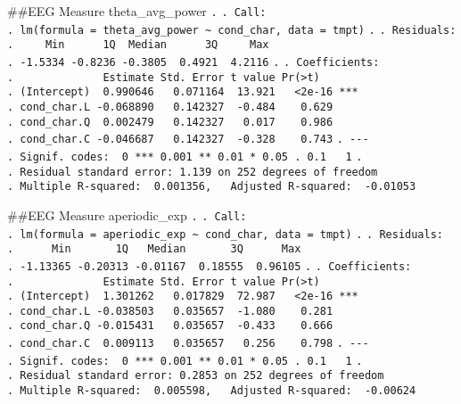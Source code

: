 \documentclass[
]{article}
\begin{document}
\#\#EEG Measure theta\_avg\_power \texttt{.} \texttt{.\ Call:}
\texttt{.\ lm(formula\ =\ theta\_avg\_power\ \textasciitilde{}\ cond\_char,\ data\ =\ tmpt)}
\texttt{.} \texttt{.\ Residuals:}
\texttt{.\ \ \ \ \ Min\ \ \ \ \ \ 1Q\ \ Median\ \ \ \ \ \ 3Q\ \ \ \ \ Max}
\texttt{.\ -1.5334\ -0.8236\ -0.3805\ \ 0.4921\ \ 4.2116} \texttt{.}
\texttt{.\ Coefficients:}
\texttt{.\ \ \ \ \ \ \ \ \ \ \ \ \ \ Estimate\ Std.\ Error\ t\ value\ Pr(\textgreater{}\textbar{}t\textbar{})}
\texttt{.\ (Intercept)\ \ 0.990646\ \ \ 0.071164\ \ 13.921\ \ \ \textless{}2e-16\ ***}
\texttt{.\ cond\_char.L\ -0.068890\ \ \ 0.142327\ \ -0.484\ \ \ \ 0.629}
\texttt{.\ cond\_char.Q\ \ 0.002479\ \ \ 0.142327\ \ \ 0.017\ \ \ \ 0.986}
\texttt{.\ cond\_char.C\ -0.046687\ \ \ 0.142327\ \ -0.328\ \ \ \ 0.743}
\texttt{.\ -\/-\/-}
\texttt{.\ Signif.\ codes:\ \ 0\ \textquotesingle{}***\textquotesingle{}\ 0.001\ \textquotesingle{}**\textquotesingle{}\ 0.01\ \textquotesingle{}*\textquotesingle{}\ 0.05\ \textquotesingle{}.\textquotesingle{}\ 0.1\ \textquotesingle{}\ \textquotesingle{}\ 1}
\texttt{.}
\texttt{.\ Residual\ standard\ error:\ 1.139\ on\ 252\ degrees\ of\ freedom}
\texttt{.\ Multiple\ R-squared:\ \ 0.001356,\ \ \ Adjusted\ R-squared:\ \ -0.01053}

\#\#EEG Measure aperiodic\_exp \texttt{.} \texttt{.\ Call:}
\texttt{.\ lm(formula\ =\ aperiodic\_exp\ \textasciitilde{}\ cond\_char,\ data\ =\ tmpt)}
\texttt{.} \texttt{.\ Residuals:}
\texttt{.\ \ \ \ \ \ Min\ \ \ \ \ \ \ 1Q\ \ \ Median\ \ \ \ \ \ \ 3Q\ \ \ \ \ \ Max}
\texttt{.\ -1.13365\ -0.20313\ -0.01167\ \ 0.18555\ \ 0.96105}
\texttt{.} \texttt{.\ Coefficients:}
\texttt{.\ \ \ \ \ \ \ \ \ \ \ \ \ \ Estimate\ Std.\ Error\ t\ value\ Pr(\textgreater{}\textbar{}t\textbar{})}
\texttt{.\ (Intercept)\ \ 1.301262\ \ \ 0.017829\ \ 72.987\ \ \ \textless{}2e-16\ ***}
\texttt{.\ cond\_char.L\ -0.038503\ \ \ 0.035657\ \ -1.080\ \ \ \ 0.281}
\texttt{.\ cond\_char.Q\ -0.015431\ \ \ 0.035657\ \ -0.433\ \ \ \ 0.666}
\texttt{.\ cond\_char.C\ \ 0.009113\ \ \ 0.035657\ \ \ 0.256\ \ \ \ 0.798}
\texttt{.\ -\/-\/-}
\texttt{.\ Signif.\ codes:\ \ 0\ \textquotesingle{}***\textquotesingle{}\ 0.001\ \textquotesingle{}**\textquotesingle{}\ 0.01\ \textquotesingle{}*\textquotesingle{}\ 0.05\ \textquotesingle{}.\textquotesingle{}\ 0.1\ \textquotesingle{}\ \textquotesingle{}\ 1}
\texttt{.}
\texttt{.\ Residual\ standard\ error:\ 0.2853\ on\ 252\ degrees\ of\ freedom}
\texttt{.\ Multiple\ R-squared:\ \ 0.005598,\ \ \ Adjusted\ R-squared:\ \ -0.00624}
\end{document}
